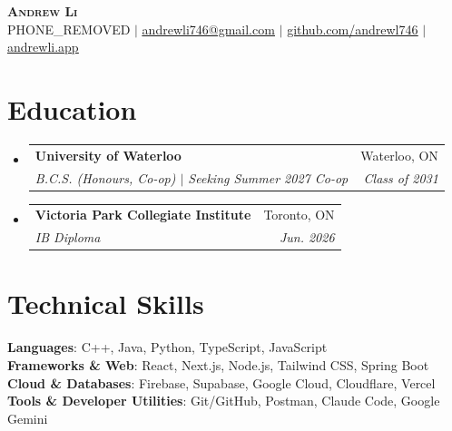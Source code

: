 \documentclass[letterpaper,11pt]{article}
\makeatletter
\newcommand{\resumeSubheading}[4]{
  \vspace{-2pt}\item
    \begin{tabular*}{0.97\textwidth}[t]{l@{\extracolsep{\fill}}r}
      \textbf{#1} & #2 \\
      \textit{\small#3} & \textit{\small #4} \\
    \end{tabular*}\vspace{-7pt}
}
\newcommand{\resumeSubHeadingListStart}{\begin{itemize}[leftmargin=0.15in, label={}]}
\newcommand{\resumeSubHeadingListEnd}{\end{itemize}}
\makeatother
\begin{document}
\begin{center}
    \textbf{\Huge \scshape Andrew Li} \\ \vspace{1pt}
    \small PHONE_REMOVED $|$ \href{mailto:andrewli746@gmail.com}{\underline{andrewli746@gmail.com}} $|$
    \href{https://github.com/andrewl746}{\underline{github.com/andrewl746}} $|$
    \href{https://andrewli.app}{\underline{andrewli.app}}
\end{center}

\section{Education}
  \resumeSubHeadingListStart
    \resumeSubheading
      {University of Waterloo}{Waterloo, ON}
      {B.C.S. (Honours, Co-op) $|$ Seeking Summer 2027 Co-op}{Class of 2031}
    \resumeSubheading
      {Victoria Park Collegiate Institute}{Toronto, ON}
      {IB Diploma}{Jun. 2026}
  \resumeSubHeadingListEnd

\section{Technical Skills}
 \begin{itemize}[leftmargin=0.15in, label={}]
    \small{\item{
     \textbf{Languages}{: C++, Java, Python, TypeScript, JavaScript} \\
     \textbf{Frameworks \& Web}{: React, Next.js, Node.js, Tailwind CSS, Spring Boot} \\
     \textbf{Cloud \& Databases}{: Firebase, Supabase, Google Cloud, Cloudflare, Vercel} \\
     \textbf{Tools \& Developer Utilities}{: Git/GitHub, Postman, Claude Code, Google Gemini}
    }}
 \end{itemize}

\end{document}

